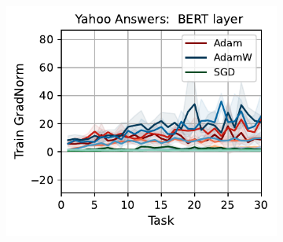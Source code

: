 \begin{figure}[htb!]
{\begin{figure}[htb!]
{        \includegraphics[width=\textwidth]{figs/GradNorm/nlp/bert_layer/yahoo_answers_40.pdf}
    }\\
\end{figure}}
\end{figure}
